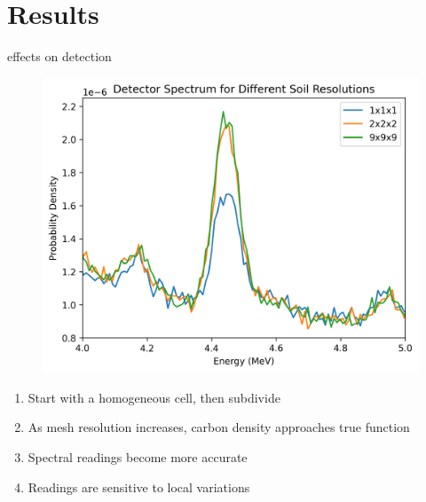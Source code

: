 \documentclass[10pt,hyperref={colorlinks,citecolor=blue,urlcolor=peking_blue,linkcolor=}]{beamer}
\theoremstyle{plain}
\begin{document}
\section{Results}
\begin{frame}{effects on detection}
\begin{figure}[Effects of resolution on detection]
\begin{center}
\includegraphics[width=1\linewidth]{../Figures/MCNP/Effectsofresolutionondetection.png}
\end{center}
\end{figure}
\begin{enumerate}
\item Start with a homogeneous cell, then subdivide
\item As mesh resolution increases, carbon density approaches true function
\item Spectral readings become more accurate
\item Readings are sensitive to local variations
\end{enumerate}
\end{frame}
\end{document}
